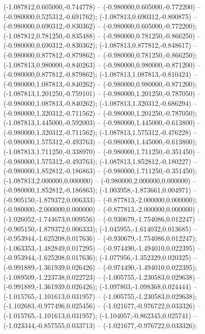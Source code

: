  (-1.087812,0.605000,-0.744778) -- (-0.980000,0.605000,-0.772200) -- (-0.980000,0.525312,-0.691762);
 (-1.087813,0.690312,-0.800875) -- (-0.980000,0.690312,-0.830362) -- (-0.980000,0.605000,-0.772200);
 (-1.087812,0.781250,-0.835488) -- (-0.980000,0.781250,-0.866250) -- (-0.980000,0.690312,-0.830362);
 (-1.087813,0.877812,-0.848617) -- (-0.980000,0.877812,-0.879862) -- (-0.980000,0.781250,-0.866250);
 (-1.087813,0.980000,-0.840263) -- (-0.980000,0.980000,-0.871200) -- (-0.980000,0.877812,-0.879862);
 (-1.087813,1.087813,-0.810424) -- (-0.980000,1.087813,-0.840262) -- (-0.980000,0.980000,-0.871200);
 (-1.087813,1.201250,-0.759101) -- (-0.980000,1.201250,-0.787050) -- (-0.980000,1.087813,-0.840262);
 (-1.087813,1.320312,-0.686294) -- (-0.980000,1.320312,-0.711562) -- (-0.980000,1.201250,-0.787050);
 (-1.087813,1.445000,-0.592003) -- (-0.980000,1.445000,-0.613800) -- (-0.980000,1.320312,-0.711562);
 (-1.087813,1.575312,-0.476228) -- (-0.980000,1.575312,-0.493763) -- (-0.980000,1.445000,-0.613800);
 (-1.087813,1.711250,-0.338970) -- (-0.980000,1.711250,-0.351450) -- (-0.980000,1.575312,-0.493763);
 (-1.087813,1.852812,-0.180227) -- (-0.980000,1.852812,-0.186863) -- (-0.980000,1.711250,-0.351450);
 (-1.087813,2.000000,0.000000) -- (-0.980000,2.000000,0.000000) -- (-0.980000,1.852812,-0.186863);
 (-1.003958,-1.873661,0.004971) -- (-0.905150,-1.879372,0.006333) -- (-0.877813,-2.000000,0.000000);
 (-0.980000,-2.000000,0.000000) -- (-0.877813,-2.000000,0.000000) ;
 (-1.026052,-1.744673,0.009556) -- (-0.930679,-1.754086,0.012247) -- (-0.905150,-1.879372,0.006333);
 (-1.045955,-1.614032,0.013685) -- (-0.953944,-1.625208,0.017636) -- (-0.930679,-1.754086,0.012247);
 (-1.063353,-1.482849,0.017295) -- (-0.974490,-1.494010,0.022395) -- (-0.953944,-1.625208,0.017636);
 (-1.077956,-1.352329,0.020325) -- (-0.991889,-1.361939,0.026426) -- (-0.974490,-1.494010,0.022395);
 (-1.089509,-1.223738,0.022723) -- (-1.005755,-1.230583,0.029638) -- (-0.991889,-1.361939,0.026426);
 (-1.097803,-1.098368,0.024444) -- (-1.015765,-1.101613,0.031957) -- (-1.005755,-1.230583,0.029638);
 (-1.102683,-0.977496,0.025456) -- (-1.021677,-0.976722,0.033326) -- (-1.015765,-1.101613,0.031957);
 (-1.104057,-0.862345,0.025741) -- (-1.023344,-0.857555,0.033713) -- (-1.021677,-0.976722,0.033326);
